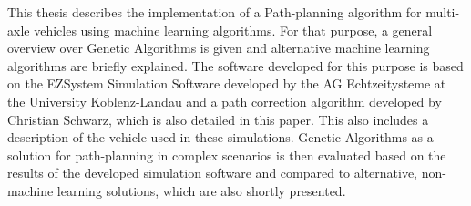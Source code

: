 \abstractEN

This thesis describes the implementation of a Path-planning algorithm for multi-axle vehicles using machine learning algorithms. For that purpose, a general overview over Genetic Algorithms is given and alternative machine learning algorithms are briefly explained. The software developed for this purpose is based on the EZSystem Simulation Software developed by the AG Echtzeitysteme at the University Koblenz-Landau and a path correction algorithm developed by Christian Schwarz, which is also detailed in this paper. This also includes a description of the vehicle used in these simulations. 
Genetic Algorithms as a solution for path-planning in complex scenarios is then evaluated based on the results of the developed simulation software and compared to alternative, non-machine learning solutions, which are also shortly presented.

